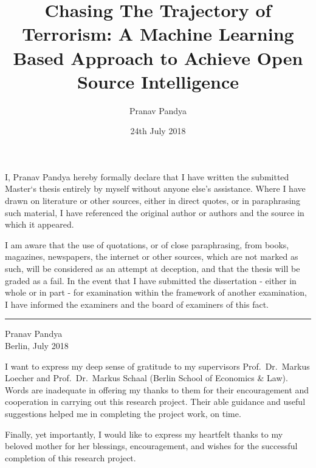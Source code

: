 \documentclass[11pt,oneside,a4paper]{reedthesis}
\title{Chasing The Trajectory of Terrorism: A Machine Learning Based Approach
to Achieve Open Source Intelligence}
\author{Pranav Pandya}
\date{24th July 2018}
\begin{document}
  \maketitle

\frontmatter %
\pagestyle{empty} %

  \begin{declaration}
    I, Pranav Pandya hereby formally declare that I have written the
    submitted Master`s thesis entirely by myself without anyone else's
    assistance. Where I have drawn on literature or other sources, either in
    direct quotes, or in paraphrasing such material, I have referenced the
    original author or authors and the source in which it appeared.
    
    I am aware that the use of quotations, or of close paraphrasing, from
    books, magazines, newspapers, the internet or other sources, which are
    not marked as such, will be considered as an attempt at deception, and
    that the thesis will be graded as a fail. In the event that I have
    submitted the dissertation - either in whole or in part - for
    examination within the framework of another examination, I have informed
    the examiners and the board of examiners of this fact.
    
    \hfill\break
    \hfill\break
    \hfill\break
    \hfill\break
    \rule{0.3\textwidth}{0.4pt} \hfill\break
    \begin{flushleft}
    Pranav Pandya\\
    Berlin, July 2018\end{flushleft}
  \end{declaration}
  \begin{acknowledgements}
    I want to express my deep sense of gratitude to my supervisors
    Prof.~Dr.~Markus Loecher and Prof.~Dr.~Markus Schaal (Berlin School of
    Economics \& Law). Words are inadequate in offering my thanks to them
    for their encouragement and cooperation in carrying out this research
    project. Their able guidance and useful suggestions helped me in
    completing the project work, on time. \par  \par
    
    Finally, yet importantly, I would like to express my heartfelt thanks to
    my beloved mother for her blessings, encouragement, and wishes for the
    successful completion of this research project.
  \end{acknowledgements}
\end{document}

